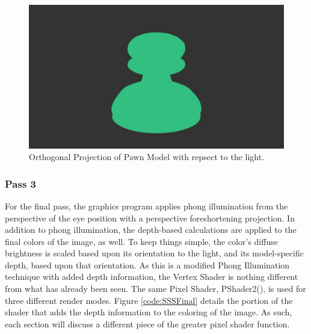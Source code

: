 \documentclass[a4paper, 12pt]{article}
\begin{document}
\begin{figure}[h]
	\centering
	\includegraphics[width=1.0\textwidth]{orthoPawn.jpg}
	\caption{Orthogonal Projection of Pawn Model with repsect to the light.}
	\label{pic:orthoPawn}
\end{figure}

\subsubsection{Pass 3}

\label{section:SSSPass3}

For the final pass, the graphics program applies phong illumination from the
perspective of the eye position with a perspective foreshortening projection.
In addition to phong illumination, the depth-based calculations are applied to
the final colors of the image, as well. To keep things simple, the color's
diffuse brightness is scaled based upon its orientation to the light, and its
model-specific depth, based upon that orientation. As this is a modified Phong
Illumination technique with added depth information, the Vertex Shader is
nothing different from what has already been seen. The same Pixel Shader,
PShader2(), is used for three different render modes. Figure
\ref{code:SSSFinal} details the portion of the shader that adds the depth
information to the coloring of the image. As such, each section will discuss a
different piece of the greater pixel shader function.
\end{document}
